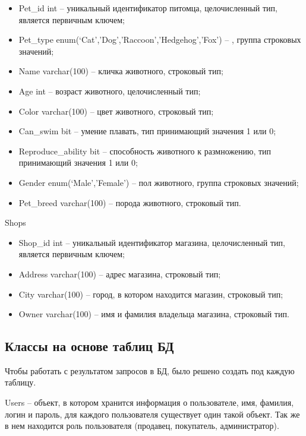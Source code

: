 \begin{itemize}
  \item Pet\_id int – уникальный идентификатор питомца, целочисленный тип, является первичным ключем;
  \item Pet\_type enum(‘Cat’,’Dog’,’Raccoon’,’Hedgehog’,’Fox’) – , группа строковых значений;
  \item Name varchar(100) – кличка животного, строковый тип;
  \item Age int – возраст животного, целочисленный тип;
  \item Color varchar(100) – цвет животного, строковый тип;
  \item Can\_swim bit – умение плавать, тип принимающий значения 1 или 0;
  \item Reproduce\_ability bit – способность животного к размножению, тип принимающий значения 1 или 0;
  \item Gender enum(‘Male’,’Female’) – пол животного, группа строковых значений;
  \item Pet\_breed varchar(100) – порода животного, строковый тип.
\end{itemize}

Shops

\begin{itemize}
  \item Shop\_id int – уникальный идентификатор магазина, целочисленный тип, является первичным ключем;
  \item Address varchar(100) – адрес магазина, строковый тип;
  \item City varchar(100) – город, в котором находится магазин, строковый тип;
  \item Owner varchar(100) – имя и фамилия владельца магазина, строковый тип.
\end{itemize}

\newpage

\subsection{Классы на основе таблиц БД}

\hspace{0cm} Чтобы работать с результатом запросов в БД, было решено создать под каждую таблицу.

\hspace{0cm} Users – объект, в котором хранится информация о пользователе, имя, фамилия, логин и пароль, для каждого пользователя существует один такой объект. Так же в нем находится роль пользователя (продавец, покупатель, администратор).


